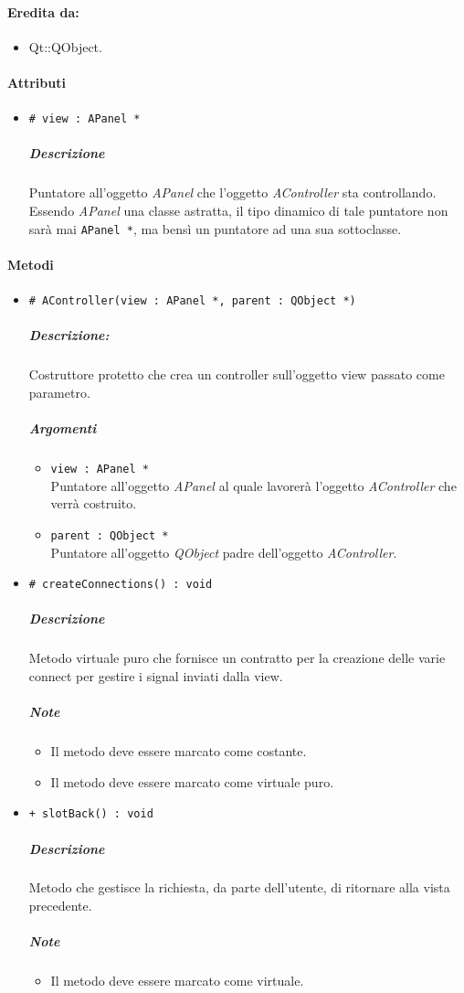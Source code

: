 	\paragraph{Eredita da:}
		\begin{itemize}
			\item Qt::QObject.
		\end{itemize}
	\paragraph{Attributi}
		\begin{itemize}
			\item \color{teal} \verb!# view : APanel *!
			\color{black}
			\subparagraph{Descrizione} Puntatore all'oggetto \textsl{APanel} che l'oggetto \textsl{AController} sta controllando. Essendo \textsl{APanel} una classe astratta, il tipo dinamico di tale puntatore non sarà mai \verb!APanel *!, ma bensì un puntatore ad una sua sottoclasse.
		\end{itemize}
	\paragraph{\color{black}Metodi}
		\begin{itemize}
			\item \color{blue} \verb!# AController(view : APanel *, parent : QObject *)!
			\color{black}
			\subparagraph{Descrizione:} Costruttore protetto che crea un controller sull'oggetto view passato come parametro.
			\color{black}
			\subparagraph{Argomenti}
			\begin{itemize}
				\item \color{RoyalPurple} \verb!view : APanel *!\\				
\color{black} Puntatore all'oggetto \textsl{APanel} al quale lavorerà l'oggetto \textsl{AController} che verrà costruito.
				\item \color{RoyalPurple} \verb!parent : QObject *!\\				
\color{black} Puntatore all'oggetto \textsl{QObject} padre dell'oggetto \textsl{AController}.
			\end{itemize}
			\item \color{blue} \verb!# createConnections() : void!
			\color{black}
			\subparagraph{Descrizione} Metodo virtuale puro che fornisce un contratto per la creazione delle varie connect per gestire i signal\g{} inviati dalla view.
			\subparagraph{Note}
			\begin{itemize}
				\item Il metodo deve essere marcato come costante.
				\item Il metodo deve essere marcato come virtuale puro.
			\end{itemize}
			\item \color{blue} \verb!+ slotBack() : void!
			\color{black}
			\subparagraph{Descrizione} Metodo che gestisce la richiesta, da parte dell'utente, di ritornare alla vista precedente.
			\subparagraph{Note}
			\begin{itemize}
				\item Il metodo deve essere marcato come virtuale.
			\end{itemize}
		\end{itemize}
	\pagebreak
